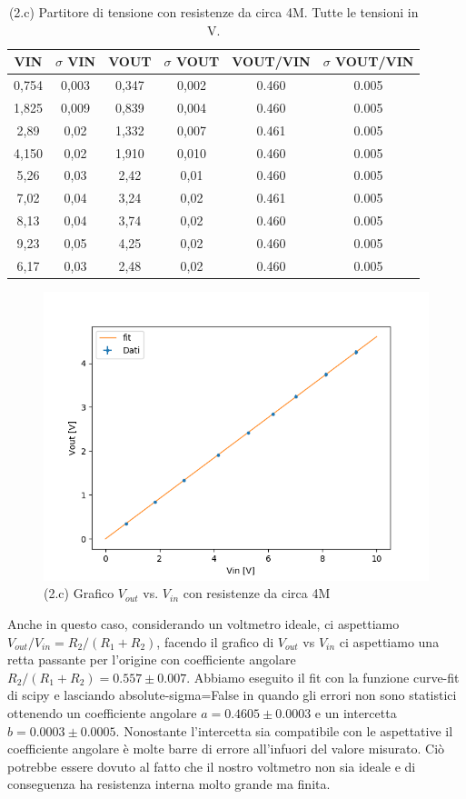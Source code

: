 \documentclass[10pt,a4paper]{article}
\begin{document}
\begin{table}[h]
\centering
\begin{tabular}{|c|c|c|c|c|c|}
\hline 
VIN& $\sigma$ VIN  &VOUT	 & $\sigma$ VOUT& VOUT/VIN & $\sigma$ VOUT/VIN \\
\hline 
0,754 & 0,003 & 0,347 & 0,002 & 0.460 & 0.005 \\
1,825 & 0,009 & 0,839 & 0,004 & 0.460 & 0.005 \\
2,89 & 0,02 & 1,332 & 0,007 & 0.461 & 0.005\\
4,150 & 0,02 & 1,910 & 0,010 & 0.460 & 0.005\\
5,26 & 0,03 & 2,42 & 0,01 & 0.460 & 0.005\\
7,02 & 0,04 & 3,24 & 0,02 & 0.461 & 0.005\\
8,13 & 0,04 & 3,74 & 0,02 & 0.460 & 0.005\\
9,23 & 0,05 & 4,25 & 0,02 & 0.460 & 0.005\\
6,17 & 0,03 & 2,48 & 0,02 & 0.460 & 0.005\\
\hline 
\end{tabular} 
\caption{(2.c) Partitore di tensione con resistenze da circa 4M. Tutte le tensioni in V.\label{t:par2}}
\end{table}


\begin{figure}[h]
\centering
\includegraphics[scale=0.6]{plot_2c.png}

\caption{(2.c) Grafico $V_{out}$ vs. $V_{in}$ con resistenze da circa 4M \label{f:par2}}
\end{figure}

Anche in questo caso, considerando un voltmetro ideale, ci aspettiamo $V_{out}/V_{in} = R_2/(R_1+R_2)$, facendo il grafico di $V_{out}$ vs $V_{in}$ ci aspettiamo una retta passante per l'origine con coefficiente angolare $R_2/(R_1+R_2) = 0.557 \pm 0.007$. Abbiamo eseguito il fit con la funzione curve-fit di scipy e lasciando absolute-sigma=False in quando gli errori non sono statistici ottenendo un coefficiente angolare $a=0.4605\pm0.0003$ e un intercetta $b=0.0003\pm0.0005$. Nonostante l'intercetta sia compatibile con le aspettative il coefficiente angolare è molte barre di errore all'infuori del valore misurato. Ciò potrebbe essere dovuto al fatto che il nostro voltmetro non sia ideale e di conseguenza ha resistenza interna molto grande ma finita.
\end{document}
